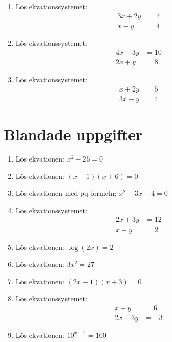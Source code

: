 \documentclass[a4paper,11pt]{article}
\begin{document}
\begin{enumerate}[label=\textbf{\arabic*.}]  
    \item Lös ekvationssystemet:
    \begin{align*}
    3x + 2y &= 7\\
    x - y &= 4
    \end{align*}
    
    \item Lös ekvationssystemet:
    \begin{align*}
    4x - 3y &= 10\\
    2x + y &= 8
    \end{align*}
    
    \item Lös ekvationssystemet:
    \begin{align*}
    x + 2y &= 5\\
    3x - y &= 4
    \end{align*}
\end{enumerate}

\section{Blandade uppgifter}

\begin{enumerate}[label=\textbf{\arabic*.}]
    \item Lös ekvationen: $x^2 - 25 = 0$
    
    \item Lös ekvationen: $(x - 1)(x + 6) = 0$
    
    \item Lös ekvationen med pq-formeln: $x^2 - 3x - 4 = 0$
    
    \item Lös ekvationssystemet:
    \begin{align*}
    2x + 3y &= 12\\
    x - y &= 2
    \end{align*}
    
    \item Lös ekvationen: $\log (2x) = 2$
    
    \item Lös ekvationen: $3x^2 = 27$
    
    \item Lös ekvationen: $(2x - 1)(x + 3) = 0$
    
    \item Lös ekvationssystemet:
    \begin{align*}
    x + y &= 6\\
    2x - 3y &= -3
    \end{align*}
    
    \item Lös ekvationen: $10^{x-1} = 100$
\end{enumerate}
\end{document}
